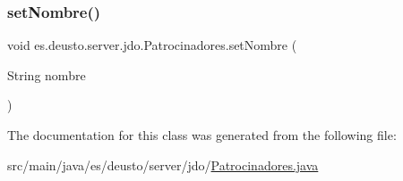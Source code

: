 \mbox{\label{classes_1_1deusto_1_1server_1_1jdo_1_1_patrocinadores_ab972f72eef2fe2259d4c70be486184f3}} 
\subsubsection{\texorpdfstring{setNombre()}{setNombre()}}
{\footnotesize\ttfamily void es.\+deusto.\+server.\+jdo.\+Patrocinadores.\+set\+Nombre (\begin{DoxyParamCaption}\item[{String}]{nombre }\end{DoxyParamCaption})}



The documentation for this class was generated from the following file\+:\begin{DoxyCompactItemize}
\item 
src/main/java/es/deusto/server/jdo/\mbox{\hyperlink{_patrocinadores_8java}{Patrocinadores.\+java}}\end{DoxyCompactItemize}
